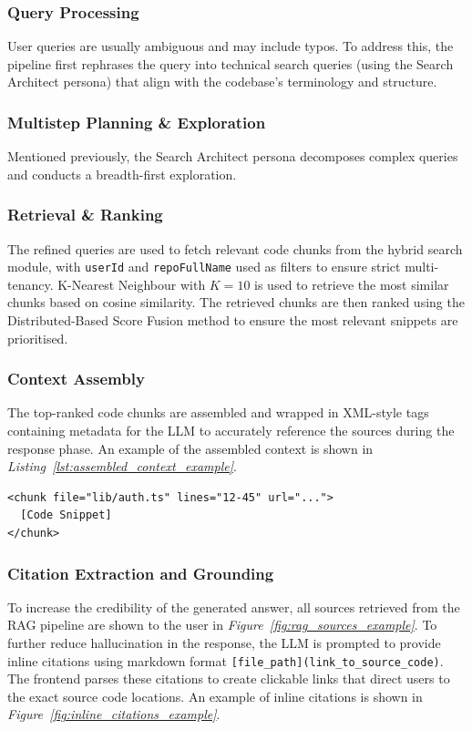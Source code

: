 \subsubsection{Query Processing}
User queries are usually ambiguous and may include typos. To address this, the pipeline first rephrases the query into technical search queries (using the Search Architect persona) that align with the codebase's terminology and structure. 

\subsubsection{Multistep Planning \& Exploration}
Mentioned previously, the Search Architect persona decomposes complex queries and conducts a breadth-first exploration. 

\subsubsection{Retrieval \& Ranking}
The refined queries are used to fetch relevant code chunks from the hybrid search module, with \texttt{userId} and \texttt{repoFullName} used as filters to ensure strict multi-tenancy. K-Nearest Neighbour with $K=10$ is used to retrieve the most similar chunks based on cosine similarity.
The retrieved chunks are then ranked using the Distributed-Based Score Fusion method to ensure the most relevant snippets are prioritised.

\subsubsection{Context Assembly}
The top-ranked code chunks are assembled and wrapped in XML-style tags containing metadata for the LLM to accurately reference the sources during the response phase. An example of the assembled context is shown in \textit{Listing~\ref{lst:assembled_context_example}}.
\begin{listing}[H]
\begin{verbatim}
<chunk file="lib/auth.ts" lines="12-45" url="...">
  [Code Snippet]
</chunk>
\end{verbatim}
\caption{\textit{Example of Assembled Context with Source Metadata.}}
\label{lst:assembled_context_example}
\end{listing}

\subsubsection{Citation Extraction and Grounding}
To increase the credibility of the generated answer, all sources retrieved from the RAG pipeline are shown to the user in \textit{Figure~\ref{fig:rag_sources_example}}. To further reduce hallucination in the response, the LLM is prompted to provide inline citations using markdown format \texttt{[file\_path](link\_to\_source\_code)}. The frontend parses these citations to create clickable links that direct users to the exact source code locations. An example of inline citations is shown in \textit{Figure~\ref{fig:inline_citations_example}}.

